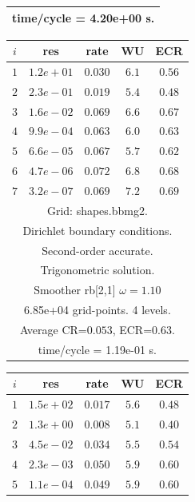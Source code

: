 \begin{table}[hbt]
\begin{center}
{\begin{tabular}{|c|c|c|c|c|}
\multicolumn{5}{|c|}{time/cycle = 4.20e+00 s.}  \\
\hline 
\end{tabular}
\begin{tabular}{|c|c|c|c|c|} \hline 
 $i$   & res      & rate    &  WU    & ECR  \\   \hline 
 $ 1$  & $ 1.2e+01$ & $0.030$ & $ 6.1$ & $0.56$ \\ 
 $ 2$  & $ 2.3e-01$ & $0.019$ & $ 5.4$ & $0.48$ \\ 
 $ 3$  & $ 1.6e-02$ & $0.069$ & $ 6.6$ & $0.67$ \\ 
 $ 4$  & $ 9.9e-04$ & $0.063$ & $ 6.0$ & $0.63$ \\ 
 $ 5$  & $ 6.6e-05$ & $0.067$ & $ 5.7$ & $0.62$ \\ 
 $ 6$  & $ 4.7e-06$ & $0.072$ & $ 6.8$ & $0.68$ \\ 
 $ 7$  & $ 3.2e-07$ & $0.069$ & $ 7.2$ & $0.69$ \\ 
\hline 
\multicolumn{5}{|c|}{Grid: shapes.bbmg2.}  \\
\multicolumn{5}{|c|}{Dirichlet boundary conditions.}  \\
\multicolumn{5}{|c|}{Second-order accurate.}  \\
\multicolumn{5}{|c|}{Trigonometric solution.}  \\
\multicolumn{5}{|c|}{Smoother rb[2,1] $\omega=1.10$}  \\
\multicolumn{5}{|c|}{6.85e+04 grid-points. 4 levels.}  \\
\multicolumn{5}{|c|}{Average CR=$0.053$, ECR=$0.63$.}  \\
\multicolumn{5}{|c|}{time/cycle = 1.19e-01 s.}  \\
\hline 
\end{tabular}
\begin{tabular}{|c|c|c|c|c|} \hline 
 $i$   & res      & rate    &  WU    & ECR  \\   \hline 
 $ 1$  & $ 1.5e+02$ & $0.017$ & $ 5.6$ & $0.48$ \\ 
 $ 2$  & $ 1.3e+00$ & $0.008$ & $ 5.1$ & $0.40$ \\ 
 $ 3$  & $ 4.5e-02$ & $0.034$ & $ 5.5$ & $0.54$ \\ 
 $ 4$  & $ 2.3e-03$ & $0.050$ & $ 5.9$ & $0.60$ \\ 
 $ 5$  & $ 1.1e-04$ & $0.049$ & $ 5.9$ & $0.60$ \\ 

\end{tabular}}
\end{center}
\end{table}

